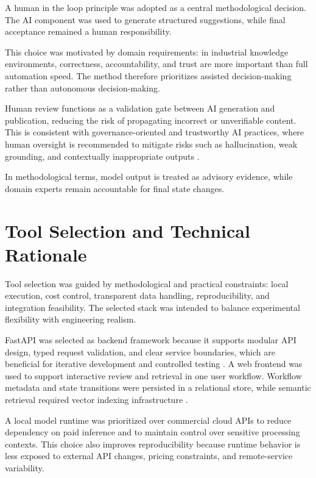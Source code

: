 A human in the loop principle was adopted as a central methodological decision.
The AI component was used to generate structured suggestions, while final acceptance remained a human responsibility.

This choice was motivated by domain requirements: in industrial knowledge environments, correctness, accountability, and trust are more important than full automation speed.
The method therefore prioritizes assisted decision-making rather than autonomous decision-making.

\vspace{0.4cm}

Human review functions as a validation gate between AI generation and publication, reducing the risk of propagating incorrect or unverifiable content.
This is consistent with governance-oriented and trustworthy AI practices, where human oversight is recommended to mitigate risks such as hallucination, weak grounding, and contextually inappropriate outputs \cite{EU_HLEG_2019}.

In methodological terms, model output is treated as advisory evidence, while domain experts remain accountable for final state changes.

\section{Tool Selection and Technical Rationale}

Tool selection was guided by methodological and practical constraints: local execution, cost control, transparent data handling, reproducibility, and integration feasibility.
The selected stack was intended to balance experimental flexibility with engineering realism.

FastAPI was selected as backend framework because it supports modular API design, typed request validation, and clear service boundaries, which are beneficial for iterative development and controlled testing \cite{FastAPI}.
A web frontend was used to support interactive review and retrieval in one user workflow.
Workflow metadata and state transitions were persisted in a relational store, while semantic retrieval required vector indexing infrastructure \cite{Schwaber-Cohen2024Apr}.

\vspace{0.4cm}

A local model runtime was prioritized over commercial cloud APIs to reduce dependency on paid inference and to maintain control over sensitive processing contexts.
This choice also improves reproducibility because runtime behavior is less exposed to external API changes, pricing constraints, and remote-service variability.

